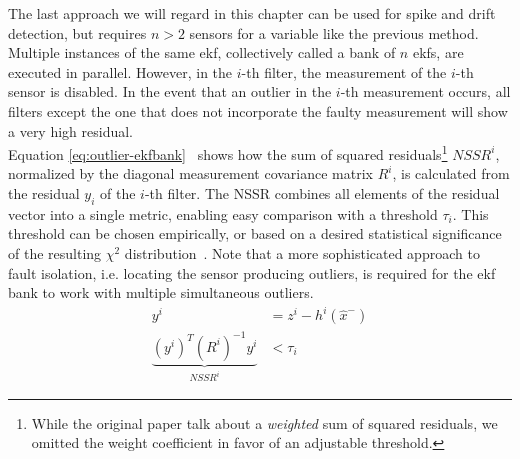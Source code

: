 The last approach we will regard in this chapter can be used for spike and drift detection, but requires $n>2$ sensors for a variable like the previous method. Multiple instances of the same \gls{ekf}, collectively called a bank of $n$ \gls{ekf}s, are executed in parallel. However, in the $i$-th filter, the measurement of the $i$-th sensor is disabled. In the event that an outlier in the $i$-th measurement occurs, all filters except the one that does not incorporate the faulty measurement will show a very high residual. \\ Equation \ref{eq:outlier-ekfbank}~\cite[p.~3]{Kobayashi.2003} shows how the sum of squared residuals\footnote{While the original paper talk about a \textit{weighted} sum of squared residuals, we omitted the weight coefficient in favor of an adjustable threshold.} $\textit{NSSR}^i$, normalized by the diagonal measurement covariance matrix $R^i$, is calculated from the residual $y_i$ of the $i$-th filter. The NSSR combines all elements of the residual vector into a single metric, enabling easy comparison with a threshold $\tau_i$. This threshold can be chosen empirically, or based on a desired statistical significance of the resulting $\chi^2$ distribution~\cite[p.~3]{Xue.2007}. Note that a more sophisticated approach to fault isolation, i.e. locating the sensor producing outliers, is required for the \gls{ekf} bank to work with multiple simultaneous outliers.
\begin{subequations}\label{eq:outlier-ekfbank}
\begin{alignat}{2}%
y^i &= z^i - h^i(\hat{x}^-) \\%
\underbrace{(y^i)^T (R^i)^{-1} y^i}_\textrm{$\textit{NSSR}^i$} &< \tau_i%
\end{alignat}
\end{subequations}
